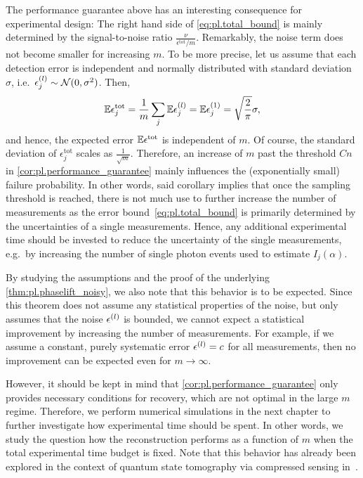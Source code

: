 The performance guarantee above has an interesting consequence for experimental design:
The right hand side of \cref{eq:pl.total_bound} is mainly determined by the signal-to-noise ratio $\frac{\nu}{\epsilon^\mathrm{tot} / m}$.
Remarkably, the noise term does not become smaller for increasing $m$.
To be more precise, let us assume that each detection error  is independent and normally distributed with standard deviation $\sigma$, i.e.\ $\epsilon^{(l)}_j \sim \mathcal{N}(0, \sigma^2)$.
Then,
\[
  \mathbb{E} \epsilon^\mathrm{tot}_j = \frac{1}{m} \sum_j \mathbb{E} \epsilon^{(l)}_j = \mathbb{E} \epsilon^{(1)}_j = \sqrt{\frac{2}{\pi}} \sigma,
\]
and hence, the expected error $\mathbb{E} \epsilon^\mathrm{tot}$ is independent of $m$.
Of course, the standard deviation of $\epsilon^\mathrm{tot}_j$ scales as $\frac{1}{\sqrt{m}}$.
Therefore, an increase of $m$ past the threshold $Cn$ in \cref{cor:pl.performance_guarantee} mainly influences the (exponentially small) failure probability.
In other words, said corollary implies that once the sampling threshold is reached, there is not much use to further increase the number of measurements as the error bound~\eqref{eq:pl.total_bound} is primarily determined by the uncertainties of a single measurements.
Hence, any additional experimental time should be invested to reduce the uncertainty of the single measurements, e.g.\ by increasing the number of single photon events used to estimate $I_j(\alpha)$.

By studying the assumptions and the proof of the underlying \cref{thm:pl.phaselift_noisy}, we also note that this behavior is to be expected.
Since this theorem does not assume any statistical properties of the noise, but only assumes that the noise $\epsilon^{(l)}$ is bounded, we cannot expect a statistical improvement by increasing the number of measurements.
For example, if we assume a constant, purely systematic error $\epsilon^{(l)} = c$ for all measurements, then no improvement can be expected even for $m\to\infty$.

However, it should be kept in mind that \cref{cor:pl.performance_guarantee} only provides necessary conditions for recovery, which are not optimal in the large $m$ regime.
Therefore, we perform numerical simulations in the next chapter to further investigate how experimental time should be spent.
In other words, we study the question how the reconstruction performs as a function of $m$ when the total experimental time budget is fixed.
Note that this behavior has already been explored in the context of quantum state tomography via compressed sensing in~\cite{Flammia_2012_Quantum}.


